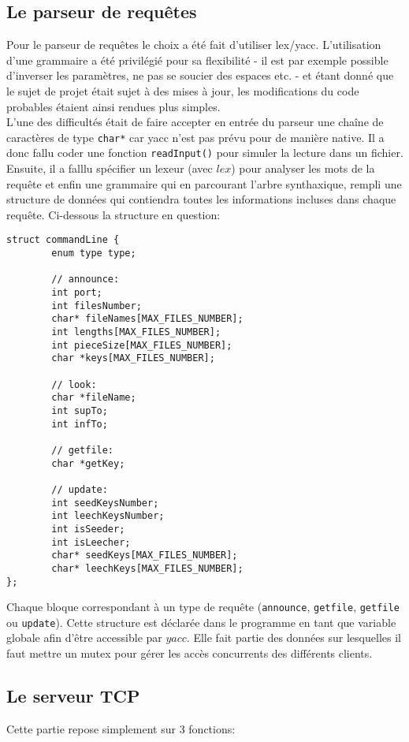 \subsection{Le parseur de requêtes}
Pour le parseur de requêtes le choix a été fait d'utiliser lex/yacc. L'utilisation d'une grammaire a été privilégié pour sa flexibilité - il est par exemple possible d'inverser les paramètres, ne pas se soucier des espaces etc. - et étant donné que le sujet de projet était sujet à des mises à jour, les modifications du code probables étaient ainsi rendues plus simples.\\
L'une des difficultés était de faire accepter en entrée du parseur une chaîne de caractères de type \texttt{char*} car yacc n'est pas prévu pour de manière native. Il a donc fallu coder une fonction \texttt{readInput()} pour simuler la lecture dans un fichier. Ensuite, il a falllu spécifier un lexeur (avec $lex$) pour analyser les mots de la requête et enfin une grammaire qui en parcourant l'arbre synthaxique, rempli une structure de données qui contiendra toutes les informations incluses dans chaque requête. Ci-dessous la structure en question:

\begin{verbatim}
struct commandLine {
        enum type type;

        // announce:
        int port;
        int filesNumber;
        char* fileNames[MAX_FILES_NUMBER];
        int lengths[MAX_FILES_NUMBER];
        int pieceSize[MAX_FILES_NUMBER];
        char *keys[MAX_FILES_NUMBER];

        // look:
        char *fileName;
        int supTo;
        int infTo;

        // getfile:
        char *getKey;

        // update:
        int seedKeysNumber;
        int leechKeysNumber;
        int isSeeder;
        int isLeecher;
        char* seedKeys[MAX_FILES_NUMBER];
        char* leechKeys[MAX_FILES_NUMBER];
};
\end{verbatim}

Chaque bloque correspondant à un type de requête (\texttt{announce}, \texttt{getfile}, \texttt{getfile} ou \texttt{update}).
Cette structure est déclarée dans le programme en tant que variable globale afin d'être accessible par $yacc$. Elle fait partie des données sur lesquelles il faut mettre un mutex pour gérer les accès concurrents des différents clients.

\subsection{Le serveur TCP}
Cette partie repose simplement sur 3 fonctions:


